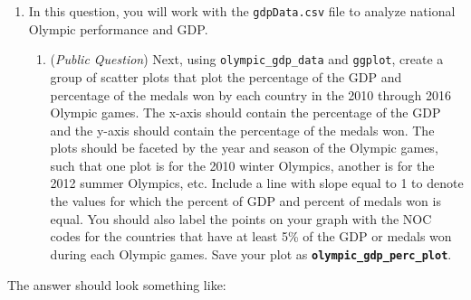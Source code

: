 \documentclass[
  12pt,
]{book}
\providecommand{\tightlist}{%
  \setlength{\itemsep}{0pt}\setlength{\parskip}{0pt}}
\begin{document}
\begin{enumerate}
\def\labelenumi{\arabic{enumi}.}
\setcounter{enumi}{1}
\item
  In this question, you will work with the \texttt{gdpData.csv} file to analyze national Olympic performance and GDP.

  \begin{enumerate}
  \def\labelenumii{\alph{enumii})}
  \setcounter{enumii}{3}
  \tightlist
  \item
    (\emph{Public Question}) Next, using \texttt{olympic\_gdp\_data} and \texttt{ggplot}, create a group of scatter plots that plot the percentage of the GDP and percentage of the medals won by each country in the 2010 through 2016 Olympic games. The x-axis should contain the percentage of the GDP and the y-axis should contain the percentage of the medals won. The plots should be faceted by the year and season of the Olympic games, such that one plot is for the 2010 winter Olympics, another is for the 2012 summer Olympics, etc. Include a line with slope equal to 1 to denote the values for which the percent of GDP and percent of medals won is equal. You should also label the points on your graph with the NOC codes for the countries that have at least 5\% of the GDP or medals won during each Olympic games. Save your plot as \textbf{\texttt{olympic\_gdp\_perc\_plot}}.
  \end{enumerate}
\end{enumerate}

The answer should look something like:
\end{document}
